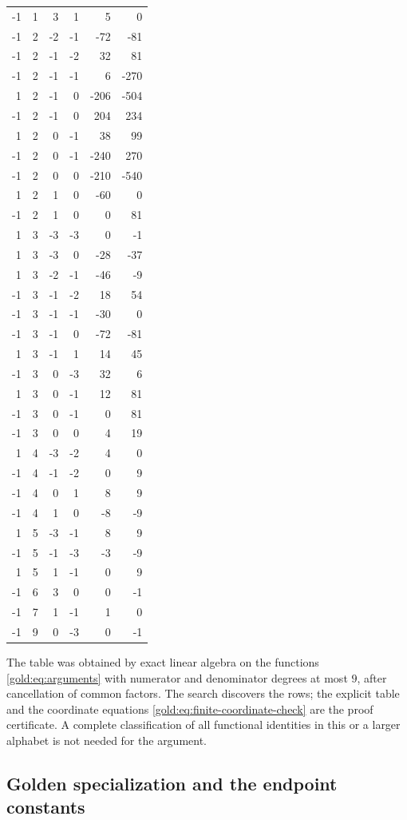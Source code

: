 \begin{longtable}{rrrrrr}
-1&1&3&1&5&0\\
-1&2&-2&-1&-72&-81\\
-1&2&-1&-2&32&81\\
-1&2&-1&-1&6&-270\\
1&2&-1&0&-206&-504\\
-1&2&-1&0&204&234\\
1&2&0&-1&38&99\\
-1&2&0&-1&-240&270\\
-1&2&0&0&-210&-540\\
1&2&1&0&-60&0\\
-1&2&1&0&0&81\\
1&3&-3&-3&0&-1\\
1&3&-3&0&-28&-37\\
1&3&-2&-1&-46&-9\\
-1&3&-1&-2&18&54\\
-1&3&-1&-1&-30&0\\
-1&3&-1&0&-72&-81\\
1&3&-1&1&14&45\\
-1&3&0&-3&32&6\\
1&3&0&-1&12&81\\
-1&3&0&-1&0&81\\
-1&3&0&0&4&19\\
1&4&-3&-2&4&0\\
-1&4&-1&-2&0&9\\
-1&4&0&1&8&9\\
-1&4&1&0&-8&-9\\
1&5&-3&-1&8&9\\
-1&5&-1&-3&-3&-9\\
1&5&1&-1&0&9\\
-1&6&3&0&0&-1\\
-1&7&1&-1&1&0\\
-1&9&0&-3&0&-1\\
\end{longtable}
\endgroup

The table was obtained by exact linear algebra on the functions
\eqref{gold:eq:arguments} with numerator and denominator degrees at most
$9$, after cancellation of common factors.  The search discovers the
rows; the explicit table and the coordinate equations
\eqref{gold:eq:finite-coordinate-check} are the proof certificate.
A complete classification of all functional identities in this or a
larger alphabet is not needed for the argument.

\subsection{Golden specialization and the endpoint constants}

